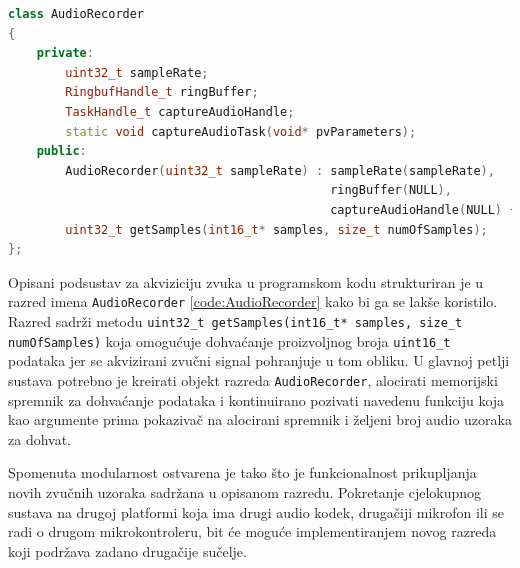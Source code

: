 \begin{lstlisting}[language=C++, caption=Razred AudioRecorder, label=code:AudioRecorder]
class AudioRecorder
{
    private:
        uint32_t sampleRate;
        RingbufHandle_t ringBuffer;
        TaskHandle_t captureAudioHandle;
        static void captureAudioTask(void* pvParameters);
    public:
        AudioRecorder(uint32_t sampleRate) : sampleRate(sampleRate), 
                                             ringBuffer(NULL), 
                                             captureAudioHandle(NULL) {}
        uint32_t getSamples(int16_t* samples, size_t numOfSamples);
};
\end{lstlisting}

Opisani podsustav za akviziciju zvuka u programskom kodu strukturiran je u razred imena 
\texttt{AudioRecorder} \ref{code:AudioRecorder} kako bi ga se lakše koristilo. Razred sadrži metodu
\texttt{uint32\_t getSamples(int16\_t* samples, size\_t numOfSamples)} koja 
omogućuje dohvaćanje proizvoljnog broja \texttt{uint16\_t} podataka jer 
se akvizirani zvučni signal pohranjuje u tom obliku. U glavnoj petlji sustava potrebno je kreirati objekt
razreda \texttt{AudioRecorder}, alocirati memorijski spremnik za dohvaćanje podataka i kontinuirano
pozivati navedenu funkciju koja kao argumente prima pokazivač na alocirani spremnik
i željeni broj audio uzoraka za dohvat.

Spomenuta modularnost ostvarena je tako što je funkcionalnost prikupljanja
novih zvučnih uzoraka sadržana u opisanom razredu. Pokretanje cjelokupnog sustava
na drugoj platformi koja ima drugi audio kodek, drugačiji mikrofon ili se 
radi o drugom mikrokontroleru, bit će moguće implementiranjem novog razreda koji
podržava zadano drugačije sučelje.